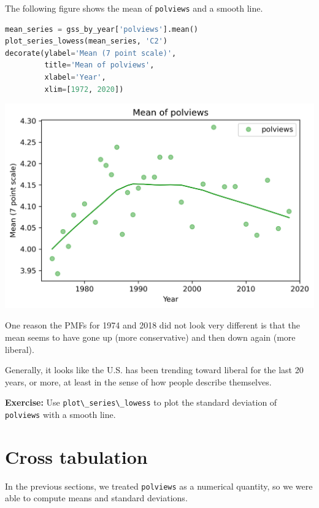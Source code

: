 The following figure shows the mean of
\passthrough{\lstinline!polviews!} and a smooth line.

\begin{lstlisting}[language=Python,style=source]
mean_series = gss_by_year['polviews'].mean()
plot_series_lowess(mean_series, 'C2')
decorate(ylabel='Mean (7 point scale)',
         title='Mean of polviews',
         xlabel='Year',
         xlim=[1972, 2020])
\end{lstlisting}

\begin{center}
\includegraphics[scale=0.75]{02_polviews_files/02_polviews_53_0.png}
\end{center}

One reason the PMFs for 1974 and 2018 did not look very different is
that the mean seems to have gone up (more conservative) and then down
again (more liberal).

Generally, it looks like the U.S. has been trending toward liberal for
the last 20 years, or more, at least in the sense of how people describe
themselves.

\textbf{Exercise:} Use \passthrough{\lstinline!plot\_series\_lowess!} to
plot the standard deviation of \passthrough{\lstinline!polviews!} with a
smooth line.

\hypertarget{cross-tabulation}{%
\section{Cross tabulation}\label{cross-tabulation}}

In the previous sections, we treated \passthrough{\lstinline!polviews!}
as a numerical quantity, so we were able to compute means and standard
deviations.

